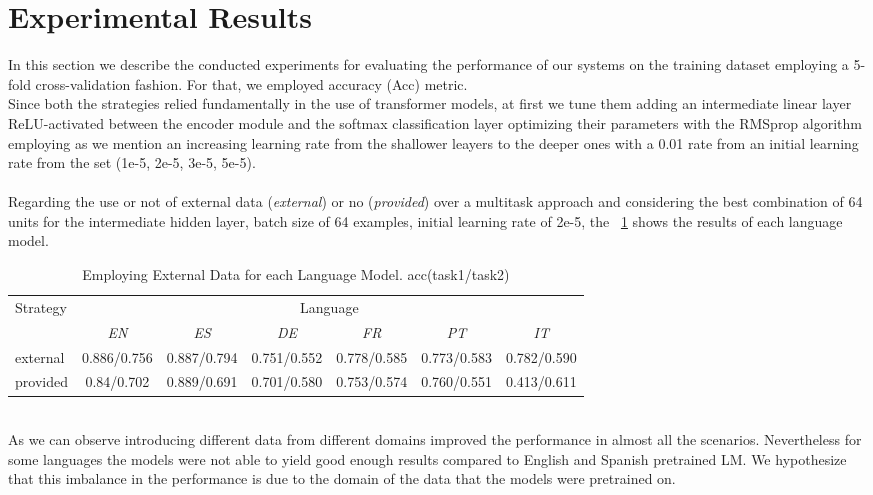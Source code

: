 \documentclass[
]{ceurart}
\begin{document}
	\section{Experimental Results}
	
	In this section we describe the conducted experiments for evaluating the performance of our systems on the training dataset employing a 5-fold cross-validation fashion. For that, we employed accuracy (Acc) metric. 
	\\
	Since both the strategies relied fundamentally in the use of transformer models, at first we tune them adding an intermediate linear layer ReLU-activated between the encoder module and the softmax classification layer optimizing their parameters with the RMSprop algorithm \cite{hinton2012lecture} employing as we mention an increasing learning rate from the shallower leayers to the deeper ones with a 0.01 rate from an initial learning rate from the set (1e-5, 2e-5, 3e-5, 5e-5).
	\\\\
	Regarding the use or not of external data (\textit{external}) or no (\textit{provided})  over a multitask approach and considering the best combination of 64 units for the intermediate hidden layer, batch size of 64 examples, initial learning rate of 2e-5, the \tablename ~\ref{data-augm} shows the results of each language model.
	\begin{table}[thb!]
		\begin{center} 		
			\caption{Employing External Data for each Language Model. acc(task1/task2)}	
			\begin{tabular}{lcccccc} 
				\hline	\multirow{2}{*}{Strategy}&\multicolumn{6}{c}{Language}\\
				\cline{2-7}
				&\textit{EN}&\textit{ES}&\textit{DE}&\textit{FR}&\textit{PT}&\textit{IT}\\
				\hline
				external &0.886/0.756&0.887/0.794&0.751/0.552&0.778/0.585&0.773/0.583&0.782/0.590\\
				provided&0.84/0.702&0.889/0.691&0.701/0.580&0.753/0.574&0.760/0.551&0.413/0.611\\
				\hline
			\end{tabular}
			\label{data-augm}		
		\end{center}
	\end{table}		 	
	\\
	As we can observe introducing different data from different domains improved the performance in almost all the scenarios. Nevertheless for some languages the models were not able to yield good enough results compared to English and Spanish pretrained LM.  We hypothesize that this imbalance in the performance is due to the domain of the data that the models were pretrained on.
\end{document}
